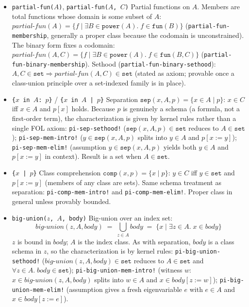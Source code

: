 \begin{itemize}
\item \texttt{partial-fun($A$)}, \texttt{partial-fun($A$, $C$)}
  Partial functions on $A$.  Members are total functions whose domain
  is some subset of $A$:
  $\mathit{partial\text{-}fun}(A) = \{f \mid \exists B \in \mathtt{power}(A).
   \; f \in \mathtt{fun}(B)\}$
  (\texttt{partial-fun-membership}, generally a proper class because
  the codomain is unconstrained).  The binary form fixes a codomain:
  $\mathit{partial\text{-}fun}(A, C) = \{f \mid \exists B \in \mathtt{power}(A).
   \; f \in \mathtt{fun}(B, C)\}$
  (\texttt{partial-fun-binary-membership}).  Sethood
  (\texttt{partial-fun-binary-sethood}):
  $A, C \in \mathtt{set} \Rightarrow \mathit{partial\text{-}fun}(A, C)
   \in \mathtt{set}$ (stated as axiom; provable once a class-union
  principle over a set-indexed family is in place).

\item \texttt{\{$x$ in $A$: $p$\}} / \texttt{\{$x$ in $A$ | $p$\}}
  Separation $\mathtt{sep}(x, A, p) = \{x \in A \mid p\}$: $x \in C$
  iff $x \in A$ and $p[x]$ holds.  Because $p$ is genuinely a schema
  (a formula, not a first-order term), the characterization is given
  by kernel rules rather than a single FOL axiom:
  \texttt{pi-sep-sethood!} ($\mathtt{sep}(x, A, p) \in \mathtt{set}$
  reduces to $A \in \mathtt{set}$);
  \texttt{pi-sep-mem-intro!} ($y \in \mathtt{sep}(x, A, p)$ splits
  into $y \in A$ and $p[x:=y]$);
  \texttt{pi-sep-mem-elim!} (assumption $y \in \mathtt{sep}(x, A, p)$
  yields both $y \in A$ and $p[x:=y]$ in context).
  Result is a set when $A \in \mathtt{set}$.

\item \texttt{\{$x$ | $p$\}}
  Class comprehension $\mathtt{comp}(x, p) = \{x \mid p\}$: $y \in C$
  iff $y \in \mathtt{set}$ and $p[x:=y]$ (members of any class are
  sets).  Same schema treatment as separation:
  \texttt{pi-comp-mem-intro!} and \texttt{pi-comp-mem-elim!}.
  Proper class in general unless provably bounded.

\item \texttt{big-union($z$, $A$, body)}
  Big-union over an index set:
  \[
    \mathit{big\text{-}union}(z, A, \mathit{body})
    \;=\; \bigcup_{z \in A} \mathit{body}
    \;=\; \{x \mid \exists z \in A.\; x \in \mathit{body}\}
  \]
  $z$ is bound in $\mathit{body}$; $A$ is the index class.
  As with separation, $\mathit{body}$ is a class schema in $z$, so the
  characterization is by kernel rules:
  \texttt{pi-big-union-sethood!}
  ($\mathit{big\text{-}union}(z, A, \mathit{body}) \in \mathtt{set}$
   reduces to $A \in \mathtt{set}$ and
   $\forall z \in A.\; \mathit{body} \in \mathtt{set}$);
  \texttt{pi-big-union-mem-intro!} (witness $w$:
   $x \in \mathit{big\text{-}union}(z, A, \mathit{body})$ splits into
   $w \in A$ and $x \in \mathit{body}[z := w]$);
  \texttt{pi-big-union-mem-elim!} (assumption gives a fresh
   eigenvariable $e$ with $e \in A$ and $x \in \mathit{body}[z := e]$).


\end{itemize}
